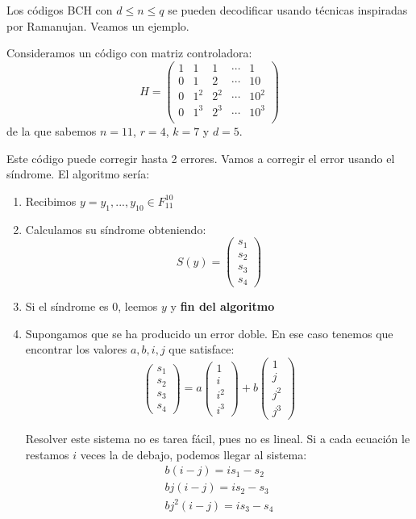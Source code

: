 Los códigos BCH con $d \leq n \leq q$ se pueden decodificar usando técnicas inspiradas por Ramanujan. Veamos un ejemplo.

\begin{example}
Consideramos un código con matriz controladora:
\[H=\left( \begin{array}{ccccc}
1& 1 & 1 & \cdots & 1 \\
0 & 1 & 2 & \cdots & 10 \\
0 & 1^2 & 2^2 & \cdots & 10^2 \\
0 & 1^3 & 2^3 & \cdots & 10^3 \\
\end{array}\right)\]
de la que sabemos $n=11$, $r=4$, $k=7$ y $d=5$.

Este código puede corregir hasta 2 errores. Vamos a corregir el error usando el síndrome. El algoritmo sería:

\begin{enumerate}
\item Recibimos $y=y_1,...,y_{10} \in F_{11}^{10}$
\item Calculamos su síndrome obteniendo:
\[S(y) = \left( \begin{array}{c} s_1 \\ s_2 \\ s_3 \\ s_4\end{array}\right)\]
\item Si el síndrome es $0$, leemos $y$ y \textbf{fin del algoritmo}
\item Supongamos que se ha producido un error doble. En ese caso tenemos que encontrar los valores $a,b,i,j$ que satisface:
\[\left( \begin{array}{c} s_1 \\ s_2 \\ s_3 \\ s_4\end{array}\right) = a\left( \begin{array}{c} 1 \\ i \\ i^2 \\ i^3\end{array}\right) + b\left( \begin{array}{c} 1 \\ j \\ j^2 \\ j^3\end{array}\right)\]

Resolver este sistema no es tarea fácil, pues no es lineal. Si a cada ecuación le restamos $i$ veces la de debajo, podemos llegar al sistema:
\[\begin{array}{l}
b(i-j) = is_1-s_2\\
bj(i-j)=is_2-s_3\\
bj^2(i-j)=is_3-s_4
\end{array}\]


\end{enumerate}
\end{example}
